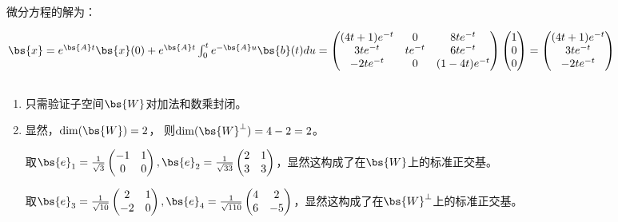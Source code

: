 微分方程的解为：

$\bs{x}=e^{\bs{A}t}\bs{x}(0)+e^{\bs{A}t} \int_{0}^t e^{-\bs{A}u}\bs{b}(t)du
=\begin{pmatrix}
    (4t+1)e^{-t} & 0 & 8te^{-t} \\
    3te^{-t} & te^{-t} & 6te^{-t} \\
    -2te^{-t}& 0 &(1-4t)e^{-t}
\end{pmatrix} \begin{pmatrix}
    1 \\
    0\\
    0
\end{pmatrix}=
\begin{pmatrix}
    (4t+1)e^{-t}  \\
    3te^{-t}  \\
    -2te^{-t}
\end{pmatrix}$

\subsection{}
\begin{enumerate}
\item 只需验证子空间$\bs{W}$对加法和数乘封闭。
\item 显然，$\dim(\bs{W})=2$，
则$\dim(\bs{W}^{\perp})=4-2=2$。

取$\bs{e}_1=\frac{1}{\sqrt{3}}\begin{pmatrix}
    -1 & 1\\
    0 & 0
\end{pmatrix},\bs{e}_2=\frac{1}{\sqrt{33}}\begin{pmatrix}
    2 & 1\\
    3 & 3
\end{pmatrix}$，显然这构成了在$\bs{W}$上的标准正交基。

取$\bs{e}_3=\frac{1}{\sqrt{10}}\begin{pmatrix}
    2 & 1\\
    -2 & 0
\end{pmatrix},\bs{e}_4=\frac{1}{\sqrt{110}}\begin{pmatrix}
    4 & 2\\
    6 & -5
\end{pmatrix}$，显然这构成了在$\bs{W}^{\perp}$上的标准正交基。
\end{enumerate}

